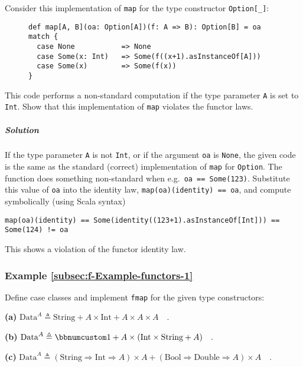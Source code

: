 Consider this implementation of \lstinline!map! for the type constructor
\lstinline!Option[_]!:

\begin{wrapfigure}{o}{0.7\columnwidth}%
\vspace{-0.4\baselineskip}
\begin{lstlisting}
def map[A, B](oa: Option[A])(f: A => B): Option[B] = oa match {
  case None           => None
  case Some(x: Int)   => Some(f((x+1).asInstanceOf[A]))
  case Some(x)        => Some(f(x))
}
\end{lstlisting}

\vspace{-1\baselineskip}
\end{wrapfigure}%
This code performs a non-standard computation if the type parameter
\lstinline!A! is set to \lstinline!Int!. Show that this implementation
of \lstinline!map! violates the functor laws.

\subparagraph{Solution}

If the type parameter \lstinline!A! is not \lstinline!Int!, or if
the argument \lstinline!oa! is \lstinline!None!, the given code
is the same as the standard (correct) implementation of \lstinline!map!
for \lstinline!Option!. The function does something non-standard
when e.g.~\lstinline!oa == Some(123)!. Substitute this value of
\lstinline!oa! into the identity law, \lstinline!map(oa)(identity) == oa!,
and compute symbolically (using Scala syntax)
\begin{lstlisting}
map(oa)(identity) == Some(identity((123+1).asInstanceOf[Int])) == Some(124) != oa
\end{lstlisting}
This shows a violation of the functor identity law.

\subsubsection{Example \label{subsec:f-Example-functors-1}\ref{subsec:f-Example-functors-1}}

Define case classes and implement \lstinline!fmap! for the given
type constructors:

\textbf{(a)} $\text{Data}^{A}\triangleq\text{String}+A\times\text{Int}+A\times A\times A\quad.$

\textbf{(b)} $\text{Data}^{A}\triangleq\bbnum 1+A\times(\text{Int}\times\text{String}+A)\quad.$

\textbf{(c)} $\text{Data}^{A}\triangleq(\text{String}\Rightarrow\text{Int}\Rightarrow A)\times A+(\text{Bool}\Rightarrow\text{Double}\Rightarrow A)\times A\quad.$

